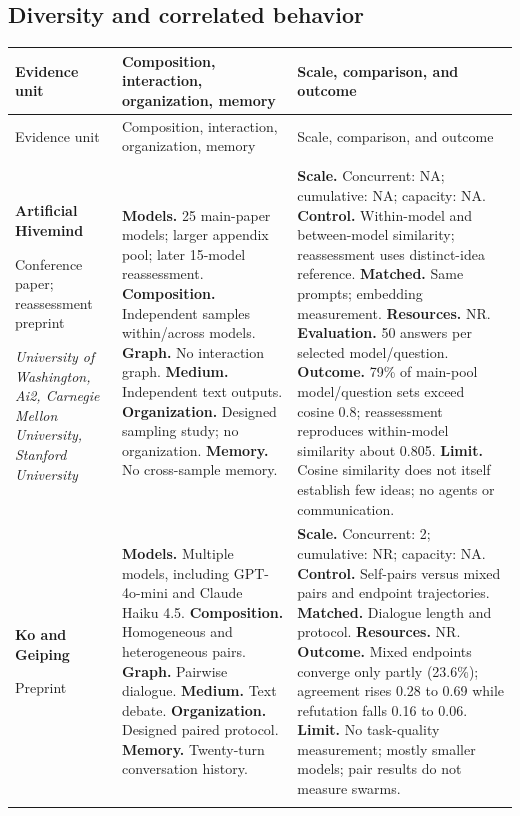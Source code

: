 \subsection{Diversity and correlated behavior}
\begingroup
\small
\setlength{\tabcolsep}{5pt}
\renewcommand{\arraystretch}{1.13}
\begin{longtable}{@{}>{\raggedright\arraybackslash}p{}>{\raggedright\arraybackslash}p{}>{\raggedright\arraybackslash}p{}@{}}
\toprule
Evidence unit & Composition, interaction, organization, memory & Scale, comparison, and outcome \\
\midrule
\endfirsthead
\toprule
Evidence unit & Composition, interaction, organization, memory & Scale, comparison, and outcome \\
\midrule
\endhead
\midrule
\multicolumn{3}{r}{Continued on next page}\\
\endfoot
\bottomrule
\endlastfoot
\textbf{Artificial Hivemind}\par \citep{artificial-hivemind,artificial-hivemind-reevaluation}\par Conference paper; reassessment preprint\par\emph{University of Washington, Ai2, Carnegie Mellon University, Stanford University} & \textbf{Models.} 25 main-paper models; larger appendix pool; later 15-model reassessment. \textbf{Composition.} Independent samples within/across models. \textbf{Graph.} No interaction graph. \textbf{Medium.} Independent text outputs. \textbf{Organization.} Designed sampling study; no organization. \textbf{Memory.} No cross-sample memory. & \textbf{Scale.} Concurrent: NA; cumulative: NA; capacity: NA. \textbf{Control.} Within-model and between-model similarity; reassessment uses distinct-idea reference. \textbf{Matched.} Same prompts; embedding measurement. \textbf{Resources.} NR. \textbf{Evaluation.} 50 answers per selected model/question. \textbf{Outcome.} 79\% of main-pool model/question sets exceed cosine 0.8; reassessment reproduces within-model similarity about 0.805. \textbf{Limit.} Cosine similarity does not itself establish few ideas; no agents or communication. \\ \addlinespace[5pt]
\textbf{Ko and Geiping}\par \citep{attractor-states-ko-geiping-paper}\par Preprint & \textbf{Models.} Multiple models, including GPT-4o-mini and Claude Haiku 4.5. \textbf{Composition.} Homogeneous and heterogeneous pairs. \textbf{Graph.} Pairwise dialogue. \textbf{Medium.} Text debate. \textbf{Organization.} Designed paired protocol. \textbf{Memory.} Twenty-turn conversation history. & \textbf{Scale.} Concurrent: 2; cumulative: NR; capacity: NA. \textbf{Control.} Self-pairs versus mixed pairs and endpoint trajectories. \textbf{Matched.} Dialogue length and protocol. \textbf{Resources.} NR. \textbf{Outcome.} Mixed endpoints converge only partly (23.6\%); agreement rises 0.28 to 0.69 while refutation falls 0.16 to 0.06. \textbf{Limit.} No task-quality measurement; mostly smaller models; pair results do not measure swarms. \\ \addlinespace[5pt]

\end{longtable}
